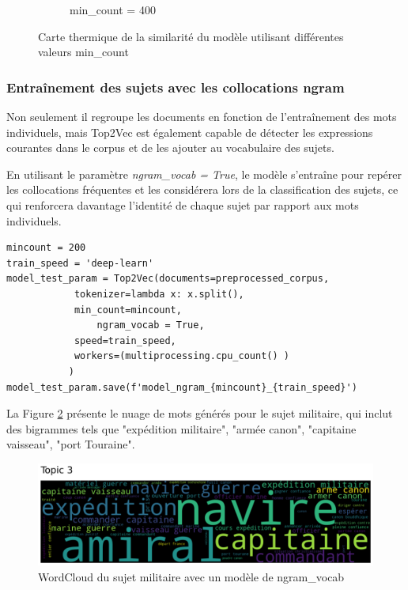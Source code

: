 \begin{figure}[H]
\begin{subfigure}[b]{0.45\textwidth}
            \caption[min\_count = 400]%
            {{min\_count = 400}}    
        \end{subfigure}
        \caption {Carte thermique de la similarité du modèle utilisant différentes valeurs min\_count}
        \label{fig:heatmap}
    \end{figure}

\subsubsection{Entraînement  des sujets avec les collocations ngram}
Non seulement il regroupe les documents en fonction de l'entraînement des mots individuels, mais Top2Vec est également capable de détecter les expressions courantes dans le corpus et de les ajouter au vocabulaire des sujets.

En utilisant le paramètre \textit{ngram\_vocab = True}, le modèle s'entraîne  pour repérer les collocations fréquentes et les considérera lors de la classification des sujets, ce qui renforcera davantage l'identité de chaque sujet par rapport aux mots individuels.

\begin{lstlisting}
mincount = 200
train_speed = 'deep-learn'
model_test_param = Top2Vec(documents=preprocessed_corpus, 
            tokenizer=lambda x: x.split(), 
            min_count=mincount,
                ngram_vocab = True,
            speed=train_speed,
            workers=(multiprocessing.cpu_count() )
           )
model_test_param.save(f'model_ngram_{mincount}_{train_speed}')
\end{lstlisting}

La Figure \ref{wc_militaire_2gram} présente le nuage de mots générés pour le sujet militaire, qui inclut des bigrammes tels que "expédition militaire", "armée canon", "capitaine vaisseau", "port Touraine".

\begin{figure}[H] %
    \centering
    \includegraphics[width=14cm]{img/3.4.wc_militaire.png}
    \caption{WordCloud du sujet militaire avec un modèle de ngram\_vocab}
    \label{wc_militaire_2gram}
\end{figure}

